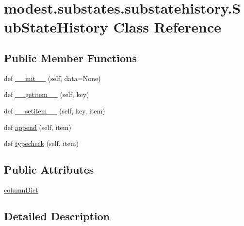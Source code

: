 \hypertarget{classmodest_1_1substates_1_1substatehistory_1_1SubStateHistory}{}\section{modest.\+substates.\+substatehistory.\+Sub\+State\+History Class Reference}
\label{classmodest_1_1substates_1_1substatehistory_1_1SubStateHistory}
\subsection*{Public Member Functions}
\begin{DoxyCompactItemize}
\item 
def \hyperlink{classmodest_1_1substates_1_1substatehistory_1_1SubStateHistory_a9b3241d53b6f6fc4700205de2f67c9c9}{\+\_\+\+\_\+init\+\_\+\+\_\+} (self, data=None)
\item 
def \hyperlink{classmodest_1_1substates_1_1substatehistory_1_1SubStateHistory_afd2ff2136228989c0ffe1bf060e161c1}{\+\_\+\+\_\+getitem\+\_\+\+\_\+} (self, key)
\item 
def \hyperlink{classmodest_1_1substates_1_1substatehistory_1_1SubStateHistory_a2e4022a0be7f5e5ee1da792ec9c75db7}{\+\_\+\+\_\+setitem\+\_\+\+\_\+} (self, key, item)
\item 
def \hyperlink{classmodest_1_1substates_1_1substatehistory_1_1SubStateHistory_a306c1e24b70225bc2009ef56d559f33c}{append} (self, item)
\item 
def \hyperlink{classmodest_1_1substates_1_1substatehistory_1_1SubStateHistory_a9654b950c535c3da3efb5798ca1b7a93}{typecheck} (self, item)
\end{DoxyCompactItemize}
\subsection*{Public Attributes}
\begin{DoxyCompactItemize}
\item 
\hyperlink{classmodest_1_1substates_1_1substatehistory_1_1SubStateHistory_aae4d508dd3968657af9abde16ff8850e}{column\+Dict}
\end{DoxyCompactItemize}


\subsection{Detailed Description}


